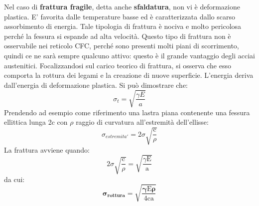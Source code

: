 Nel caso di \textbf{frattura fragile}, detta anche \textbf{sfaldatura}, non vi è deformazione plastica. E’ favorita dalle temperature basse ed è caratterizzata dallo scarso assorbimento di energia. Tale tipologia di frattura è nociva e molto pericolosa perché la fessura si espande ad alta velocità. Questo tipo di frattura non è osservabile nei reticolo CFC, perché sono presenti molti piani di scorrimento, quindi ce ne sarà sempre qualcuno attivo: questo è il grande vantaggio degli acciai austenitici. Focalizzandosi sul carico teorico di frattura, si osserva che esso comporta la rottura dei legami e la creazione di nuove superficie. L’energia deriva dall’energia di deformazione plastica. Si può dimostrare che:
\begin{equation*}
    \sigma_t = \sqrt{\frac{\gamma E}{a}}
\end{equation*}
Prendendo ad esempio come riferimento una lastra piana contenente una fessura ellittica lunga 2c con $\rho$ raggio di curvatura all’estremità dell’ellisse:
\begin{equation*}
    \sigma_{estremita'} = 2\sigma\sqrt{\frac{\mathrm{c}}{\rho}}
\end{equation*}
La frattura avviene quando:
\begin{equation*}
    2\sigma\sqrt{\frac{\mathrm{c}}{\rho}} = \sqrt{\frac{\gamma \mathrm{E}}{\mathrm{a}}}
\end{equation*}
da cui:
\begin{equation*}
    \boldsymbol{\sigma_{rottura} = \sqrt{\frac{\gamma \mathrm{E} \rho}{\mathrm{4ca}}}}
\end{equation*}

